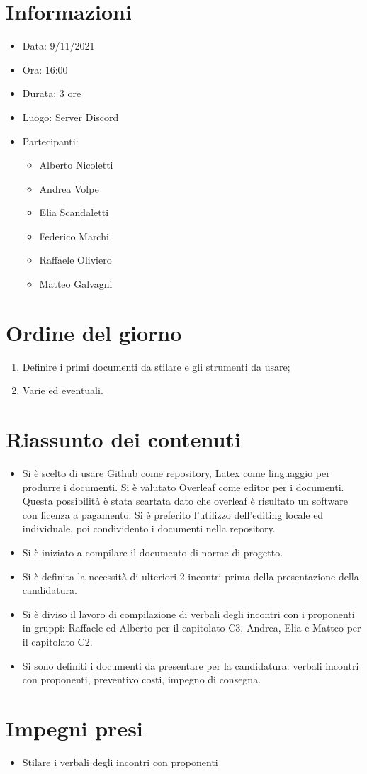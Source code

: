 \documentclass[a4paper, 12pt]{article}
\begin{document}
\makefrontpage

\section{Informazioni}

\begin{itemize}
\item Data: 9/11/2021
\item Ora: 16:00
\item Durata: 3 ore
\item Luogo: Server Discord
\item Partecipanti: 
\begin{itemize}
\item Alberto Nicoletti
\item Andrea Volpe
\item Elia Scandaletti
\item Federico Marchi
\item Raffaele Oliviero
\item Matteo Galvagni
\end{itemize}
\end{itemize}

\section{Ordine del giorno}
\begin{enumerate}
\item Definire i primi documenti da stilare e gli strumenti da usare;
\item Varie ed eventuali.
\end{enumerate}

\section{Riassunto dei contenuti}

\begin{itemize}
\item Si è scelto di usare Github come repository, Latex come linguaggio per produrre i documenti. Si è valutato Overleaf come editor per i documenti. Questa possibilità è stata scartata dato che overleaf è risultato un software con licenza a pagamento. Si è preferito l'utilizzo dell'editing locale ed individuale, poi condividento i documenti nella repository.
\item Si è iniziato a compilare il documento di norme di progetto.
\item Si è definita la necessità di ulteriori 2 incontri prima della presentazione della candidatura.
\item Si è diviso il lavoro di compilazione di verbali degli incontri con i proponenti in gruppi: Raffaele ed Alberto per il capitolato C3, Andrea, Elia e Matteo per il capitolato C2.
\item Si sono definiti i documenti da presentare per la candidatura: verbali incontri con proponenti, preventivo costi, impegno di consegna.
\end{itemize}

\section{Impegni presi}
\begin{itemize}
\item{Stilare i verbali degli incontri con proponenti}
\end{itemize}
\end{document}
